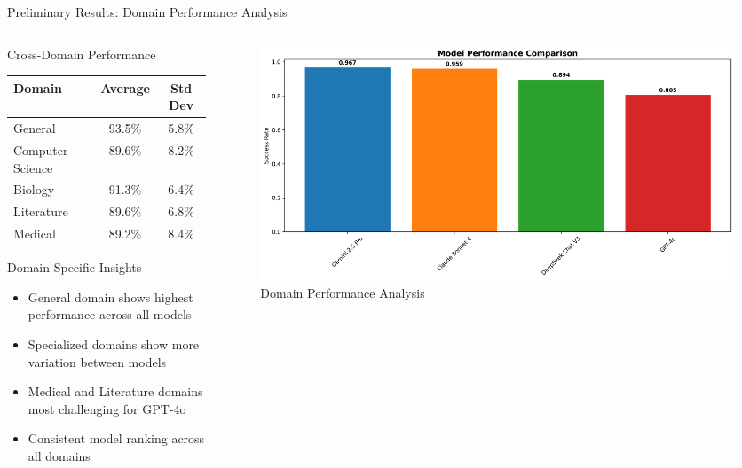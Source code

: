 \documentclass[aspectratio=169]{beamer}
\begin{document}
\begin{frame}{Preliminary Results: Domain Performance Analysis}
\begin{columns}[c]
\begin{column}{0.5\textwidth}
\begin{block}{Cross-Domain Performance}
\begin{center}
\begin{tabular}{lcc}
\toprule
\textbf{Domain} & \textbf{Average} & \textbf{Std Dev} \\
\midrule
General & 93.5\% & 5.8\% \\
Computer Science & 89.6\% & 8.2\% \\
Biology & 91.3\% & 6.4\% \\
Literature & 89.6\% & 6.8\% \\
Medical & 89.2\% & 8.4\% \\
\bottomrule
\end{tabular}
\end{center}
\end{block}

\begin{block}{Domain-Specific Insights}
\begin{itemize}
    \item General domain shows highest performance across all models
    \item Specialized domains show more variation between models
    \item Medical and Literature domains most challenging for GPT-4o
    \item Consistent model ranking across all domains
\end{itemize}
\end{block}
\end{column}

\begin{column}{0.48\textwidth}
\begin{figure}
\includegraphics[width=\textwidth]{comprehensive_figures/figure5_domain.png}
\caption{Domain Performance Analysis}
\end{figure}
\end{column}
\end{columns}
\end{frame}
\end{document}
